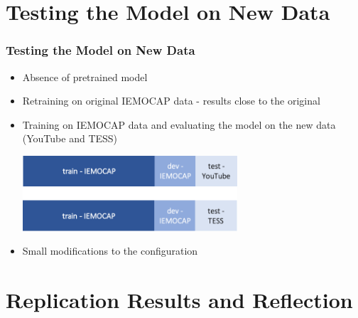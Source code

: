 \documentclass{beamer}
\begin{document}
\section{Testing the Model on New Data}

\begin{frame}
\frametitle{Testing the Model on New Data}

\begin{itemize}
    \item Absence of pretrained model
    \item Retraining on original IEMOCAP data - results close to the original 
    \item Training on IEMOCAP data and evaluating the model on the new data (YouTube and TESS)
        \begin{center}
            \includegraphics[width=8cm]{images/data_pipeline.png}
        \end{center}
    \item Small modifications to the configuration
\end{itemize}
\end{frame}


\section{Replication Results and Reflection}

\end{document}
